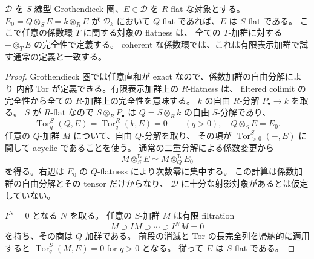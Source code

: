 \begin{lemma}
\label{lem:abel-flat-coefficient-upgrade}
$\mathcal D$ を $S$-線型 Grothendieck 圏、$E\in\mathcal D$ を
$R$-flat な対象とする。
$E_0=Q\otimes_S E=k\otimes_R E$ が
$\mathcal D_k$ において $Q$-flat であれば、$E$ は $S$-flat である。
ここで任意の係数環 $T$ に関する対象の flatness は、
全ての $T$-加群に対する $-\otimes_T E$ の完全性で定義する。
coherent な係数環では、これは有限表示加群で試す通常の定義と一致する。
\end{lemma}

\begin{proof}
Grothendieck 圏では任意直和が exact なので、係数加群の自由分解により
内部 Tor が定義できる。有限表示加群上の $R$-flatness は、
filtered colimit の完全性から全ての $R$-加群上の完全性を意味する。
$k$ の自由 $R$-分解 $P_\bullet\to k$ を取る。
$S$ が $R$-flat なので $S\otimes_RP_\bullet$ は
$Q=S\otimes_Rk$ の自由 $S$-分解であり、
\[
 \operatorname{Tor}^S_q(Q,E)
 =\operatorname{Tor}^R_q(k,E)=0\qquad(q>0),
 \quad Q\otimes_SE=E_0.
\]
任意の $Q$-加群 $M$ について、自由 $Q$-分解を取り、
その項が $\operatorname{Tor}^S_{>0}(-,E)$ に関して acyclic であることを使う。
通常の二重分解による係数変更から
\[
 M\otimes_S^{\mathbf L}E
 \simeq M\otimes_Q^{\mathbf L}E_0
\]
を得る。右辺は $E_0$ の $Q$-flatness により次数零に集中する。
この計算は係数加群の自由分解とその tensor だけからなり、
$\mathcal D$ に十分な射影対象があるとは仮定していない。

$I^N=0$ となる $N$ を取る。
任意の $S$-加群 $M$ は有限 filtration
\[
 M\supset IM\supset\cdots\supset I^NM=0
\]
を持ち、その商は $Q$-加群である。
前段の消滅と Tor の長完全列を帰納的に適用すると
$\operatorname{Tor}^S_q(M,E)=0$ for $q>0$ となる。
従って $E$ は $S$-flat である。
\end{proof}

